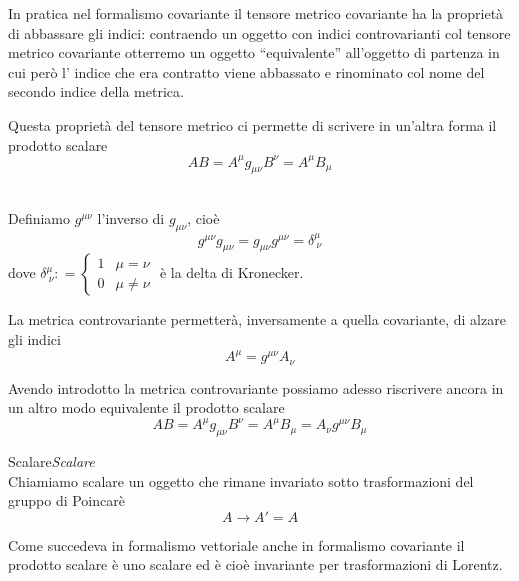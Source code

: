 \documentclass[12pt,a4paper,titlepage, twoside, openright]{book}
\newenvironment{definizione}[1][\empty]{\begin{Definizione}{
\ifx\empty#1\relax\else\mdseries\itshape#1\\\fi
}{}}{\end{Definizione}}
\numberwithin{equation}{chapter}
\begin{document}
In pratica nel formalismo covariante il tensore metrico covariante ha la proprietà di abbassare gli indici: contraendo un oggetto con indici controvarianti col tensore metrico covariante otterremo un oggetto ``equivalente'' all'oggetto di partenza in cui però l' indice che era contratto viene abbassato e rinominato col nome del secondo indice della metrica.

Questa proprietà del tensore metrico ci permette di scrivere in un'altra forma il prodotto scalare
\[
AB=A^\mu g_{\mu\nu} B^\nu = A^\mu B_\mu
\]

\begin{definizione}
Definiamo $g^{\mu\nu}$ l'inverso di $g_{\mu\nu}$, cioè
\[
g^{\mu\nu}g_{\mu\nu}=g_{\mu\nu}g^{\mu\nu}=\delta^{\mu}_{\> \nu}
\]
dove $\delta^{\mu}_{\> \nu}\mathrel{\mathop:}=\begin{cases}1 & \mu=\nu \\ 0 & \mu\neq\nu \end{cases}$ è la delta di Kronecker.
\end{definizione}

La metrica controvariante permetterà, inversamente a quella covariante, di alzare gli indici\footnotemark{}
\[
A^\mu=g^{\mu\nu}A_\nu
\]

Avendo introdotto la metrica controvariante possiamo adesso riscrivere ancora in un altro modo equivalente il prodotto scalare
\begin{equation}\label{prodotto scalare}
AB=A^\mu g_{\mu\nu} B^\nu = A^\mu B_\mu = A_\nu g^{\mu\nu} B_\mu
\end{equation}

\begin{definizione}[Scalare]
Chiamiamo scalare un oggetto che rimane invariato sotto trasformazioni del gruppo di Poincarè
\[A\longrightarrow A'=A\]
\end{definizione}

Come succedeva in formalismo vettoriale anche in formalismo covariante il prodotto scalare è uno scalare ed è cioè invariante per trasformazioni di Lorentz.
\end{document}
